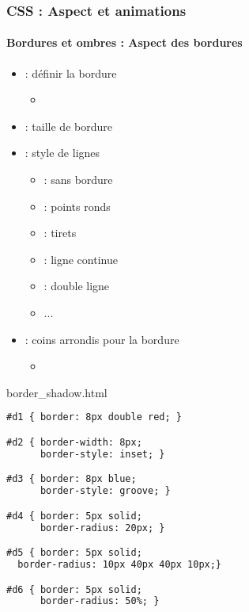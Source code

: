 \documentclass[xcolor=table]{beamer}
\begin{document}
\begin{frame}[fragile]
\frametitle{CSS : Aspect et animations}
\framesubtitle{Bordures et ombres : Aspect des bordures}

\begin{minipage}{0.47\textwidth}
	\begin{itemize}
		\item {} : définir la bordure 
		\begin{itemize}
			\item {}
		\end{itemize}
		\item {} : taille de bordure
		\item {} : style de lignes
		\begin{itemize}
			\item {} : sans bordure
			\item {} : points ronds
			\item {} : tirets
			\item {} : ligne continue
			\item {} : double ligne
			\item ...
		\end{itemize}
		\item {} : coins arrondis pour la bordure
		\begin{itemize}
			\item {}
		\end{itemize}
	\end{itemize}
\end{minipage}
%
\begin{minipage}{0.52\textwidth}
\begin{exampleblock}{border\_shadow.html}
\lstset{escapeinside=**}
\scriptsize\bfseries\vspace{-6pt}
\begin{lstlisting}[language={html}]
#d1 { border: 8px double red; }

#d2 { border-width: 8px;
      border-style: inset; }

#d3 { border: 8px blue;
      border-style: groove; }

#d4 { border: 5px solid;
      border-radius: 20px; }

#d5 { border: 5px solid;
  border-radius: 10px 40px 40px 10px;}

#d6 { border: 5px solid;
      border-radius: 50%; }
\end{lstlisting}\vspace{-6pt}
\end{exampleblock}
\end{minipage}
\end{frame}
\end{document}
